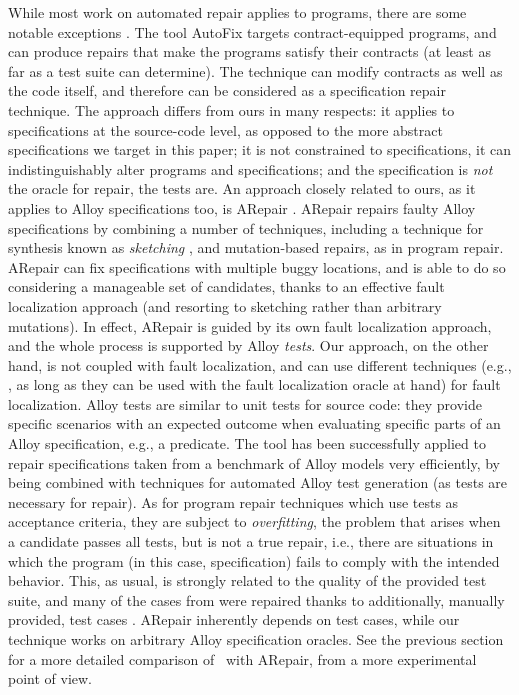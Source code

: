 While most work on automated repair applies to programs, there are some notable exceptions \cite{Pei+2014,Wang+2018,Wang+2019}. The tool AutoFix \cite{Pei+2014} targets contract-equipped programs, and can produce repairs that make the programs satisfy their contracts (at least as far as a test suite can determine). The technique can modify contracts as well as the code itself, and therefore can be considered as a specification repair technique. The approach differs from ours in many respects: it applies to specifications at the source-code level, as opposed to the more abstract specifications we target in this paper; it is not constrained to specifications, it can indistinguishably alter programs and specifications; and the specification is \emph{not} the oracle for repair, the tests are. An approach closely related to ours, as it applies to Alloy specifications too, is ARepair \cite{Wang+2018,Wang+2019}. ARepair repairs faulty Alloy specifications by combining a number of techniques, including a technique for synthesis known as \emph{sketching} \cite{DBLP:journals/sttt/Solar-Lezama13}, and mutation-based repairs, as in program repair. ARepair can fix specifications with multiple buggy locations, and is able to do so considering a manageable set of candidates, thanks to an effective fault localization approach (and resorting to sketching rather than arbitrary mutations). In effect, ARepair is guided by its own fault localization approach, and the whole process is supported by Alloy \emph{tests}. Our approach, on the other hand, is not coupled with fault localization, and can use different techniques (e.g., \cite{DBLP:journals/corr/abs-1807-08707,Zheng+2021}, as long as they can be used with the fault localization oracle at hand) for fault localization. Alloy tests are similar to unit tests for source code: they provide specific scenarios with an expected outcome when evaluating specific parts of an Alloy specification, e.g., a predicate. The tool has been successfully applied to repair specifications taken from a benchmark of Alloy models \cite{Nelson+2017} very efficiently, by being combined with techniques for automated Alloy test generation (as tests are necessary for repair). As for program repair techniques which use tests as acceptance criteria, they are subject to \emph{overfitting}, the problem that arises when a candidate passes all tests, but is not a true repair, i.e., there are situations in which the program (in this case, specification) fails to comply with the intended behavior. This, as usual, is strongly related to the quality of the provided test suite, and many of the cases from \cite{Nelson+2017} were repaired thanks to additionally, manually provided, test cases \cite{Wang+2018,Wang+2019}. ARepair inherently depends on test cases, while our technique works on arbitrary Alloy specification oracles. See the previous section for a more detailed comparison of \technique\ with ARepair, from a more experimental point of view. 

